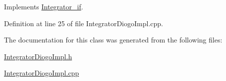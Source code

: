 Implements \hyperlink{class_integrator__if_a49c27818a4b0caf41c39d22a18b41337}{Integrator\-\_\-if}.



Definition at line 25 of file Integrator\-Diogo\-Impl.\-cpp.



The documentation for this class was generated from the following files\-:\begin{DoxyCompactItemize}
\item 
\hyperlink{_integrator_diogo_impl_8h}{Integrator\-Diogo\-Impl.\-h}\item 
\hyperlink{_integrator_diogo_impl_8cpp}{Integrator\-Diogo\-Impl.\-cpp}\end{DoxyCompactItemize}
